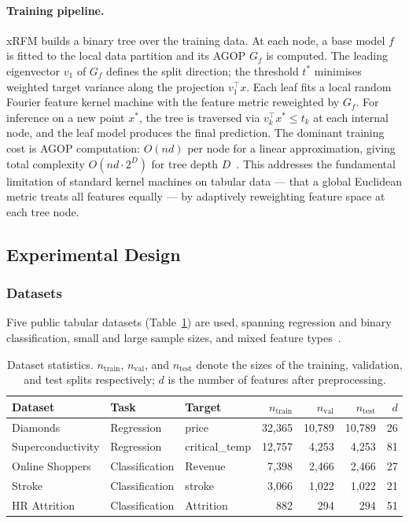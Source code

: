 \paragraph{Training pipeline.}
xRFM builds a binary tree over the training data. At each node, a base model $f$ is fitted to the local data partition and its AGOP $G_f$ is computed. The leading eigenvector $v_1$ of $G_f$ defines the split direction; the threshold $t^*$ minimises weighted target variance along the projection $v_1^\top x$. Each leaf fits a local random Fourier feature kernel machine with the feature metric reweighted by $G_f$. For inference on a new point $x^*$, the tree is traversed via $v_k^\top x^* \leq t_k$ at each internal node, and the leaf model produces the final prediction. The dominant training cost is AGOP computation: $O(nd)$ per node for a linear approximation, giving total complexity $O(nd\cdot 2^D)$ for tree depth $D$~\citep{beaglehole2025xrfm}. This addresses the fundamental limitation of standard kernel machines on tabular data — that a global Euclidean metric treats all features equally — by adaptively reweighting feature space at each tree node.

\subsection{Experimental Design}

\subsubsection{Datasets}

Five public tabular datasets (Table~\ref{tab:datasets}) are used, spanning regression and binary classification, small and large sample sizes, and mixed feature types~\citep{hamidieh2018data,sakar2019real,fedesoriano2021stroke}.

\begin{table}[H]
  \centering
  \caption{Dataset statistics. $n_\text{train}$, $n_\text{val}$, and $n_\text{test}$ denote the sizes of the training, validation, and test splits respectively; $d$ is the number of features after preprocessing.}
  \label{tab:datasets}
  \begin{tabular}{lllrrrr}
    \toprule
    Dataset & Task & Target & $n_\text{train}$ & $n_\text{val}$ & $n_\text{test}$ & $d$ \\
    \midrule
    Diamonds            & Regression     & price          & 32{,}365 & 10{,}789 & 10{,}789 & 26 \\
    Superconductivity   & Regression     & critical\_temp & 12{,}757 &  4{,}253 &  4{,}253 & 81 \\
    Online Shoppers     & Classification & Revenue        &  7{,}398 &  2{,}466 &  2{,}466 & 27 \\
    Stroke              & Classification & stroke         &  3{,}066 &  1{,}022 &  1{,}022 & 21 \\
    HR Attrition        & Classification & Attrition      &    882   &    294   &    294   & 51 \\
    \bottomrule
  \end{tabular}
\end{table}

